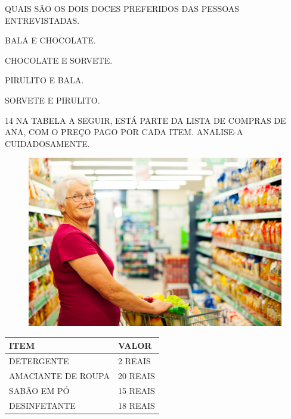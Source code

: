 \pagebreak
QUAIS SÃO OS DOIS DOCES PREFERIDOS DAS PESSOAS ENTREVISTADAS.

\begin{escolha}%
\item BALA E CHOCOLATE.

\item CHOCOLATE E SORVETE.

\item PIRULITO E BALA.

\item SORVETE E PIRULITO.
\end{escolha}

\num{14} NA TABELA A SEGUIR, ESTÁ PARTE DA LISTA DE COMPRAS DE ANA, COM O PREÇO PAGO POR CADA ITEM. ANALISE-A CUIDADOSAMENTE.

\begin{figure}[H]
\includegraphics[width=\textwidth]{./media/image117.png}
\end{figure}

\begin{table}[H]
    \centering
    \begin{tabular}{|l|l|}
    \hline
        \large\textbf{ITEM} & \large\textbf{VALOR} \\ \hline
        \large{DETERGENTE} & \large{2 REAIS} \\ \hline
        \large{AMACIANTE DE ROUPA} & \large{20 REAIS} \\ \hline
        \large{SABÃO EM PÓ} & \large{15 REAIS} \\ \hline
        \large{DESINFETANTE} & \large{18 REAIS} \\ \hline
    \end{tabular}
\end{table}

